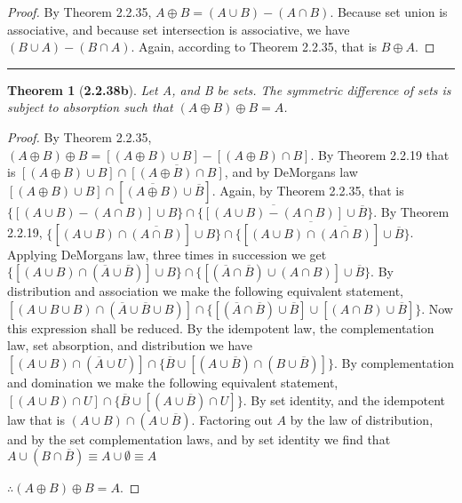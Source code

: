 \documentclass[a4paper, 12pt]{article}
\theoremstyle{plain}
\newtheorem*{theorem*}{Theorem}
\begin{document}
\begin{proof}
    By Theorem 2.2.35, $A \oplus B = (A \cup B) - (A \cap B)$. Because set union is 
    associative, and because set intersection is associative, we have 
    \newline $(B \cup A) - (B \cap A)$. Again, according to Theorem 2.2.35, that is 
    $B \oplus A$.
\end{proof}
\begin{center}
    \rule{5.4in}{1pt}
\end{center}


\begin{theorem*}[\textbf{2.2.38b}]
    Let A, and B be sets. The symmetric difference of sets is subject to absorption such that 
    $(A \oplus B) \oplus B = A$.
\end{theorem*}

\begin{proof}
    By Theorem 2.2.35, $(A \oplus B) \oplus B = [(A \oplus B) \cup B] - [(A \oplus B) \cap B]$. 
    By Theorem 2.2.19 that is $[(A \oplus B) \cup B] \cap \overline{[(A \oplus B) \cap B]}$, 
    and by DeMorgans law $[(A \oplus B) \cup B] \cap [\overline{(A \oplus B)} \cup \overline{B}]$. 
    Again, by Theorem 2.2.35, that is \newline 
    $\{[(A \cup B) - (A \cap B)] \cup B\} \cap 
    \{\overline{[(A \cup B) - (A \cap B)]} \cup \overline{B}\}$. By Theorem 2.2.19, 
    $\{[(A \cup B) \cap \overline{(A \cap B)}] \cup B\} \cap 
    \{\overline{[(A \cup B) \cap \overline{(A \cap B)}]} \cup \overline{B}\}$. Applying 
    DeMorgans law, three times in succession we get \newline 
    $\{[(A \cup B) \cap (\overline{A} \cup \overline{B})] \cup B\} \cap 
    \{[(\overline{A} \cap \overline{B}) \cup (A \cap B)] \cup \overline{B}\}$. By distribution 
    and association we make the following equivalent statement, \newline 
    $[(A \cup B \cup B) \cap (\overline{A} \cup \overline{B} \cup B)] \cap 
    \{[(\overline{A} \cap \overline{B}) \cup \overline{B}] \cup [(A \cap B) \cup \overline{B}]\}$. 
    Now this expression shall be reduced. By the idempotent law, the complementation law, 
    set absorption, and distribution we have \newline 
    $[(A \cup B) \cap (\overline{A} \cup U)] \cap 
    \{\overline{B} \cup [(A \cup \overline{B}) \cap (B \cup \overline{B})]\}$. By complementation 
    and domination we make the following equivalent statement, \newline 
    $[(A \cup B) \cap U] \cap \{\overline{B} \cup [(A \cup \overline{B}) \cap U]\}$. By set 
    identity, and the idempotent law that is $(A \cup B) \cap (A \cup \overline{B})$. Factoring 
    out $A$ by the law of distribution, and by the set complementation laws, and by set identity 
    we find that \newline $A \cup (B \cap \overline{B}) \equiv A \cup \emptyset \equiv A$
    
    $\therefore (A \oplus B) \oplus B = A$.
\end{proof}
\end{document}
